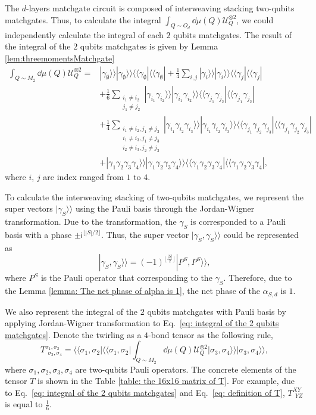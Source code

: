 \documentclass{article}
\newcommand{\ii}{\mathsf{i}}
\newcommand{\supket}[1]{|#1 \rangle\rangle}
\newcommand{\supbra}[1]{\langle\langle #1 |}
\newcommand{\supketbra}[2]{
    \supket{#1 } \supket{#1 } \supbra{#2} \supbra{#2} 
}
\newcommand{\floor}[1]{\lfloor #1 \rfloor}
\begin{document}
The $d$-layers matchgate circuit is composed of interweaving stacking two-qubits matchgates. Thus, to calculate the integral $\int_{Q \sim O_d} \dd\mu(Q) \mathcal{U}_Q^{\otimes 2}$, we could independently calculate the integral of each $2$ qubits matchgates. The result of the integral of the $2$ qubits matchgates is given by Lemma \ref{lem:threemomentsMatchgate}
\begin{align}
\label{eq: integral of the 2 qubits matchgates}
    \int_{Q\sim M_2} \dd\mu(Q)\mathcal{U}_Q^{\otimes 2} =& \supketbra{\gamma_\emptyset}{\gamma_\emptyset}
    + \frac{1}{4} \sum_{i,j} \supketbra{\gamma_i}{\gamma_j}\\
    &+ \frac{1}{6}\sum_{\substack{i_1\neq i_2 \\ j_1\neq j_2}}\supketbra{\gamma_{i_1}\gamma_{i_2}}{\gamma_{j_1}\gamma_{j_2}} \\
    &+ \frac{1}{4}
    \sum_{\substack{i_1\neq i_2, j_1 \neq j_2 \\ 
        i_1\neq i_3, j_1 \neq j_3 \\
        i_2\neq i_3, j_2 \neq j_3} 
    }
    \supketbra{\gamma_{i_1}\gamma_{i_2}\gamma_{i_3}}{\gamma_{j_1}\gamma_{j_2}\gamma_{j_3}}\\
    &+ \supketbra{\gamma_1\gamma_2\gamma_3\gamma_4}{\gamma_1\gamma_2\gamma_3\gamma_4},
\end{align}
where $i$, $j$ are index ranged from $1$ to $4$. 



To calculate the interweaving stacking of two-qubits matchgates, we represent the super vectors $\supket{\gamma_S}$ using the Pauli basis through the Jordan-Wigner transformation. Due to the transformation, the $\gamma_S$ is corresponded to a Pauli basis with a phase $\pm \ii^{\floor{|S|/2}}$. Thus, the super vector $\supket{\gamma_S, \gamma_S}$ could be represented as 
\begin{equation}
    \supket{\gamma_S, \gamma_S} = (-1)^{\floor{\frac{|S|}{2}}} \supket{P^{S}, P^{S}},
\end{equation}
 where $P^{S}$ is the Pauli operator that corresponding to the $\gamma_S$.
Therefore, due to the Lemma \ref{lemma: The net phase of alpha is 1}, the net phase of the $\alpha_{S,d}$ is $1$. 

We also represent the integral of the $2$ qubits matchgates with Pauli basis by applying Jordan-Wigner transformation to Eq.~\eqref{eq: integral of the 2 qubits matchgates}. Denote the twirling as a $4$-bond tensor as the following rule,
\begin{equation}
\label{eq: definition of T}
    T^{\sigma_1, \sigma_2}_{~~\sigma_3, \sigma_4} = \supbra{\sigma_1, \sigma_2}\supbra{\sigma_1, \sigma_2}\int_{Q\sim M_2} \dd\mu(Q)\mathcal{U}_Q^{\otimes 2} \supket{\sigma_3, \sigma_4}\supket{\sigma_3, \sigma_4},
\end{equation}
where $\sigma_1, \sigma_2, \sigma_3, \sigma_4$ are two-qubits Pauli operators. The concrete elements of the tensor $T$ is shown in the Table \ref{table: the 16x16 matrix of T}. For example, due to Eq.~\eqref{eq: integral of the 2 qubits matchgates} and Eq.~\eqref{eq: definition of T}, $T^{XY}_{~~YZ}$ is equal to $\frac{1}{6}$. 
\end{document}

